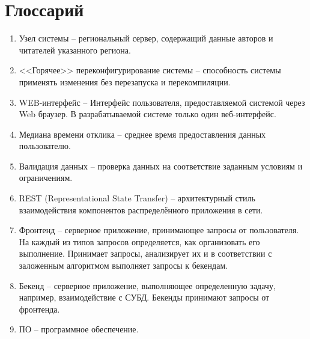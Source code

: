 \section*{Глоссарий}
\begin{enumerate}
	\item Узел системы -- региональный сервер, содержащий данные авторов и читателей указанного региона.
	
	\item <<Горячее>> переконфигурирование системы -- способность системы применять изменения без перезапуска и перекомпиляции.

        \item WEB-интерфейс -- Интерфейс пользователя, предоставляемой системой через Web
браузер. В разрабатываемой системе только один веб-интерфейс.

	\item Медиана времени отклика -- среднее время предоставления данных пользователю.
	
	\item Валидация данных  -- проверка данных на соответствие заданным условиям и ограничениям.
	
	\item REST (Representational State Transfer) -- архитектурный стиль взаимодействия компонентов распределённого приложения в сети. 
	
	\item Фронтенд -- серверное приложение, принимающее запросы от пользователя. На каждый из типов запросов определяется, как организовать его выполнение. Принимает запросы, анализирует их и в соответствии с заложенным алгоритмом выполняет запросы к бекендам.
	
	\item Бекенд -- серверное приложение, выполняющее определенную задачу, например, взаимодействие с СУБД. Бекенды принимают запросы от фронтенда.
	
	\item ПО -- программное обеспечение.
\end{enumerate}
